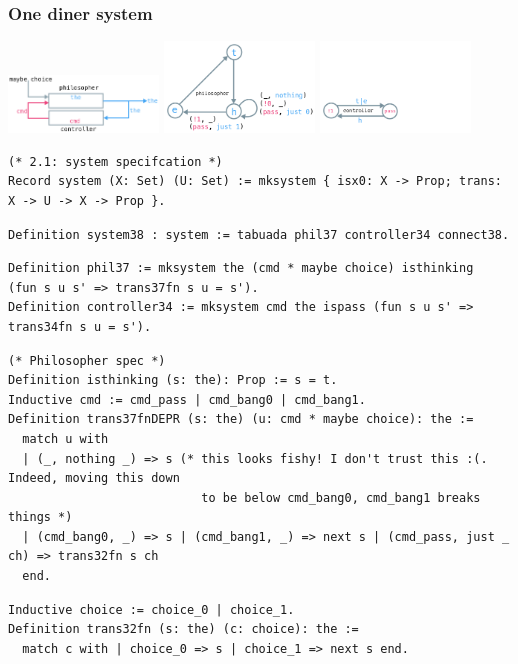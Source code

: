 \documentclass{beamer}
\begin{document}
\begin{frame}[fragile]
\frametitle{One diner system}
\pause
\includegraphics[width=0.3\textwidth]{phil-controller-connection.png}
\includegraphics[width=0.3\textwidth]{phil-transition.png}
\includegraphics[width=0.3\textwidth]{controller-transition.png}

\pause
{\tiny
\begin{verbatim}
(* 2.1: system specifcation *)
Record system (X: Set) (U: Set) := mksystem { isx0: X -> Prop; trans: X -> U -> X -> Prop }.
\end{verbatim}
\pause
\begin{verbatim}
Definition system38 : system := tabuada phil37 controller34 connect38.
\end{verbatim}
\pause

\begin{verbatim}
Definition phil37 := mksystem the (cmd * maybe choice) isthinking  (fun s u s' => trans37fn s u = s').
Definition controller34 := mksystem cmd the ispass (fun s u s' => trans34fn s u = s').
\end{verbatim}
\pause
\begin{verbatim}
(* Philosopher spec *)
Definition isthinking (s: the): Prop := s = t.
Inductive cmd := cmd_pass | cmd_bang0 | cmd_bang1.
Definition trans37fnDEPR (s: the) (u: cmd * maybe choice): the :=
  match u with
  | (_, nothing _) => s (* this looks fishy! I don't trust this :(. Indeed, moving this down 
                           to be below cmd_bang0, cmd_bang1 breaks things *)
  | (cmd_bang0, _) => s | (cmd_bang1, _) => next s | (cmd_pass, just _ ch) => trans32fn s ch
  end.
\end{verbatim}
\pause
\begin{verbatim}
Inductive choice := choice_0 | choice_1.
Definition trans32fn (s: the) (c: choice): the :=
  match c with | choice_0 => s | choice_1 => next s end.
\end{verbatim}

}
\end{frame}
\end{document}
